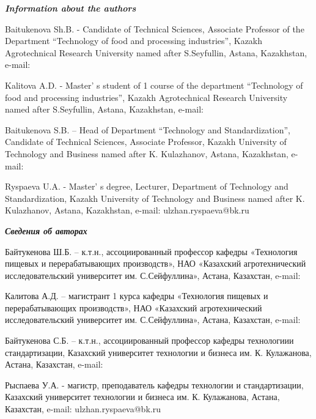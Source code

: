 \begin{authorinfo}
\emph{{\bfseries Information about the authors}}

Baitukenova Sh.B. - Candidate of Technical Sciences, Associate Professor
of the Department ``Technology of food and processing industries'',
Kazakh Agrotechnical Research University named after S.Seyfullin,
Astana, Kazakhstan, e-mail:

Kalitova A.D. - Master' s student of 1 course of the
department ``Technology of food and processing industries'', Kazakh
Agrotechnical Research University named after S.Seyfullin, Astana,
Kazakhstan, e-mail:


Baitukenova S.B. -- Head of Department ``Technology and
Standardization'', Candidate of Technical Sciences, Associate Professor,
Kazakh University of Technology and Business named after K. Kulazhanov,
Astana, Kazakhstan, e-mail:


Ryspaeva U.A. - Master' s degree, Lecturer, Department of
Technology and Standardization, Kazakh University of Technology and
Business named after K. Kulazhanov, Astana, Kazakhstan, e-mail:
ulzhan.ryspaeva@bk.ru

\emph{{\bfseries Сведения об авторах}}

Байтукенова Ш.Б. -- к.т.н., ассоциированный профессор кафедры
«Технология пищевых и перерабатывающих производств», НАО «Казахский
агротехнический исследовательский университет им. С.Сейфуллина», Астана,
Казахстан, e-mail:


Калитова А.Д. -- магистрант 1 курса кафедры «Технология пищевых и
перерабатывающих производств», НАО «Казахский агротехнический
исследовательский университет им. С.Сейфуллина», Астана, Казахстан,
e-mail:


Байтукенова С.Б. -- к.т.н., ассоциированный профессор кафедры
технологиии стандартизации, Казахский университет технологии и бизнеса
им. К. Кулажанова, Астана, Казахстан, e-mail:


Рыспаева У.А. - магистр, преподаватель кафедры технологии и
стандартизации, Казахский университет технологии и бизнеса им. К.
Кулажанова, Астана, Казахстан, e-mail:
ulzhan.ryspaeva@bk.ru
\end{authorinfo}
